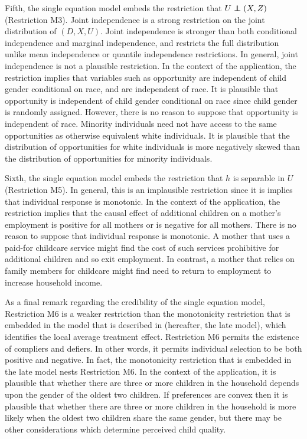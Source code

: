 \documentclass[12pt,a4paper,twoside]{article}
\newcommand\independent{\protect\mathpalette{\protect\independenT}{\perp}}
\def\independenT#1#2{\mathrel{\rlap{$#1#2$}\mkern2mu{#1#2}}}
\numberwithin{equation}{section}
\begin{document}
Fifth, the single equation model embeds the restriction that $U\independent (X,Z)$ (Restriction M3). Joint independence is a strong restriction on the joint distribution of $(D,X,U)$. Joint independence is stronger than both conditional independence and marginal independence, and restricts the full distribution unlike mean independence or quantile independence restrictions. In general, joint independence is not a plausible restriction. In the context of the application, the restriction implies that variables such as opportunity are independent of child gender conditional on race, and are independent of race. It is plausible that opportunity is independent of child gender conditional on race since child gender is randomly assigned. However, there is no reason to suppose that opportunity is independent of race. Minority individuals need not have access to the same opportunities as otherwise equivalent white individuals. It is plausible that the distribution of opportunities for white individuals is more negatively skewed than the distribution of opportunities for minority individuals.  

Sixth, the single equation model embeds the restriction that $h$ is separable in $U$ (Restriction M5). In general, this is an implausible restriction since it is implies that individual response is monotonic. In the context of the application, the restriction implies that the causal effect of additional children on a mother's employment is positive for all mothers or is negative for all mothers. There is no reason to suppose that individual response is monotonic. A mother that uses a paid-for childcare service might find the cost of such services prohibitive for additional children and so exit employment. In contrast, a mother that relies on family members for childcare might find need to return to employment to increase household income.

As a final remark regarding the credibility of the single equation model, Restriction M6 is a weaker restriction than the monotonicity restriction that is embedded in the model that is described in \cite{ai94} (hereafter, the late model), which identifies the local average treatment effect. Restriction M6 permits the existence of compliers and defiers. In other words, it permits individual selection to be both positive and negative. In fact, the monotonicity restriction that is embedded in the late model nests Restriction M6. In the context of the application, it is plausible that whether there are three or more children in the household depends upon the gender of the oldest two children. If preferences are convex then it is plausible that whether there are three or more children in the household is more likely when the oldest two children share the same gender, but there may be other considerations which determine perceived child quality. 
\end{document}
